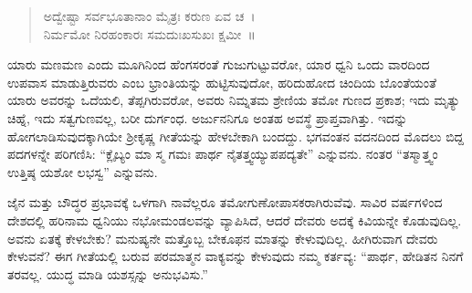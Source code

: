 \begin{verse}
ಅದ್ವೇಷ್ಟಾ ಸರ್ವಭೂತಾನಾಂ ಮೈತ್ರಃ ಕರುಣ ಏವ ಚ~।\\ನಿರ್ಮಮೋ ನಿರಹಂಕಾರಃ ಸಮದುಃಖಸುಖಃ ಕ್ಷಮೀ~॥
\end{verse}

ಯಾರು ಮಣಮಣ ಎಂದು ಮೂಗಿನಿಂದ ಹೆಂಗಸರಂತೆ ಗುಜುಗುಟ್ಟುವರೋ, ಯಾರ ಧ್ವನಿ ಒಂದು ವಾರದಿಂದ ಉಪವಾಸ ಮಾಡುತ್ತಿರುವರು ಎಂಬ ಭ್ರಾಂತಿಯನ್ನು ಹುಟ್ಟಿಸುವುದೋ, ಹರಿದುಹೋದ ಚಿಂದಿಯ ಬೊಂತೆಯಂತೆ ಯಾರು ಅವರನ್ನು ಒದೆಯಲಿ, ತೆಪ್ಪಗಿರುವರೋ, ಅವರು ನಿಮ್ನತಮ ಶ್ರೇಣಿಯ ತಮೋ ಗುಣದ ಪ್ರಕಾಶ; ಇದು ಮೃತ್ಯು ಚಿಹ್ನೆ, ಇದು ಸತ್ವಗುಣವಲ್ಲ, ಬರೀ ದುರ್ಗಂಧ. ಅರ್ಜುನನಿಗೂ ಅಂತಹ ಅವಸ್ಥೆ ಪ್ರಾಪ್ತವಾಗಿತ್ತು. ಇದನ್ನು ಹೋಗಲಾಡಿಸುವುದಕ್ಕಾಗಿಯೇ ಶ‍್ರೀಕೃಷ್ಣ ಗೀತೆಯನ್ನು ಹೇಳಬೇಕಾಗಿ ಬಂದದ್ದು. ಭಗವಂತನ ವದನದಿಂದ ಮೊದಲು ಬಿದ್ದ ಪದಗಳನ್ನೇ ಪರಿಗಣಿಸಿ: “ಕ್ಲೈಬ್ಯಂ ಮಾ ಸ್ಮ ಗಮಃ ಪಾರ್ಥ ನೈತತ್ತ್ವಯ್ಯುಪಪದ್ಯತೇ” ಎನ್ನುವನು. ನಂತರ “ತಸ್ಮಾತ್ತ್ವಂ ಉತ್ತಿಷ್ಠ ಯಶೋ ಲಭಸ್ವ” ಎನ್ನುವನು.

ಜೈನ ಮತ್ತು ಬೌದ್ಧರ ಪ್ರಭಾವಕ್ಕೆ ಒಳಗಾಗಿ ನಾವೆಲ್ಲರೂ ತಮೋಗುಣೋಪಾಸಕರಾಗಿರು\-ವೆವು. ಸಾವಿರ ವರ್ಷಗಳಿಂದ ದೇಶದಲ್ಲಿ ಹರಿನಾಮ ಧ್ವನಿಯು ನಭೋಮಂಡಲವನ್ನು ವ್ಯಾಪಿಸಿದೆ, ಆದರೆ ದೇವರು ಅದಕ್ಕೆ ಕಿವಿಯನ್ನೇ ಕೊಡುವುದಿಲ್ಲ. ಅವನು ಏತಕ್ಕೆ ಕೇಳಬೇಕು? ಮನುಷ್ಯನೇ ಮತ್ತೊಬ್ಬ ಬೇಕೂಫನ ಮಾತನ್ನು ಕೇಳುವುದಿಲ್ಲ. ಹೀಗಿರುವಾಗ ದೇವರು ಕೇಳುವನೆ? ಈಗ ಗೀತೆಯಲ್ಲಿ ಬರುವ ಪರಮಾತ್ಮನ ವಾಕ್ಯವನ್ನು ಕೇಳುವುದು ನಮ್ಮ ಕರ್ತವ್ಯ: “ಪಾರ್ಥ, ಹೇಡಿತನ ನಿನಗೆ ತರವಲ್ಲ. ಯುದ್ಧ ಮಾಡಿ ಯಶಸ್ಸನ್ನು ಅನುಭವಿಸು.”

